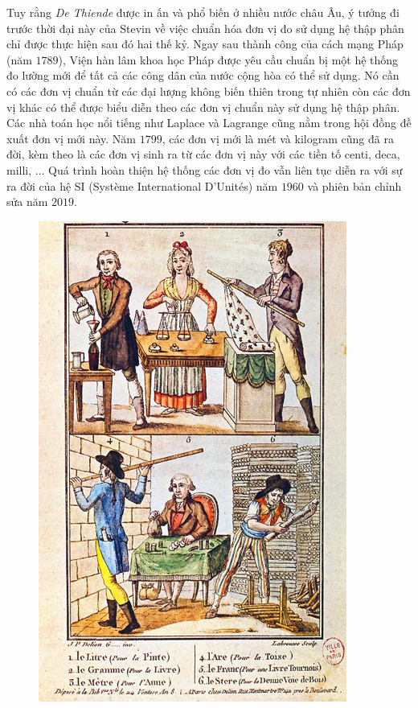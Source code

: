 \begin{multicols}{2}
	Tuy rằng \textit{De Thiende} được in ấn và phổ biến ở nhiều nước châu Âu, ý tưởng đi trước thời đại này của Stevin về việc chuẩn hóa đơn vị đo sử dụng hệ thập phân chỉ được thực hiện sau đó hai thế kỷ. Ngay sau thành công của cách mạng Pháp (năm $1789$), Viện hàn lâm khoa học Pháp được yêu cầu chuẩn bị một hệ thống đo lường mới để tất cả các công dân của nước cộng hòa có thể sử dụng. Nó cần có các đơn vị chuẩn từ các đại lượng không biến thiên trong tự nhiên còn các đơn vị khác có thể được biểu diễn theo các đơn vị chuẩn này sử dụng hệ thập phân. Các nhà toán học nổi tiếng như Laplace và Lagrange cũng nằm trong hội đồng đề xuất đơn vị mới này. Năm $1799$, các đơn vị mới là mét và kilogram cũng đã ra đời, kèm theo là các đơn vị sinh ra từ các đơn vị này với các tiền tố centi, deca, \linebreak milli, ... Quá trình hoàn thiện hệ thống các đơn vị đo vẫn liên tục diễn ra với sự ra đời của hệ SI (Système International D'Unités) năm $1960$ và phiên bản chỉnh sửa năm $2019$. 
	\begin{figure}[H]
		\vspace*{-5pt}
		\centering
		\captionsetup{labelformat= empty, justification=centering}
		\includegraphics[width= 0.95\linewidth]{2}

\end{figure}
\end{multicols}
